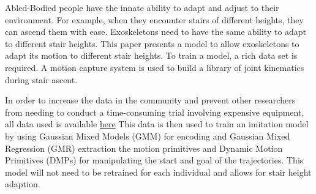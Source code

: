 Abled-Bodied people have the innate ability to adapt and adjust to their environment.  For example, when they encounter stairs of different heights, they can ascend them with ease. Exoskeletons need to have the same ability to adapt to different stair heights. This paper presents a model to allow exoskeletons to adapt its motion to different stair heights. To train a model, a rich data set is required. A motion capture system is used to build a library of joint kinematics during stair ascent.

In order to increase the data in the community and prevent other researchers from needing to conduct a time-consuming trial involving expensive equipment, all data used is available \href{https://github.com/WPI-AIM/AIM_GaitData.git}{here} This data is then used to train an imitation model by using Gaussian Mixed Models (GMM) for encoding and Gaussian Mixed Regression (GMR) extraction the motion primitives and Dynamic Motion Primitives (DMPs) for manipulating the start and goal of the trajectories. This model will not need to be retrained for each individual and allows for stair height adaption.